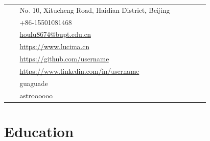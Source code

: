\documentclass[10pt]{article} %
\begin{document}
\begin{paracol}{2}
\parbox[top][0.12\textheight][c]{\linewidth}{ %
	\vspace{-0.04\textheight} %
	\colorbox{shade}{ %
		\begin{supertabular}{p{0.05\linewidth}|p{0.775\linewidth}} %
			\raisebox{-1pt}{\faHome} & No. 10, Xitucheng Road, Haidian District, Beijing \\ %
			\raisebox{-1pt}{\faPhone} & +86-15501081468 \\ %
			\raisebox{0pt}{\small\faEnvelope} & \href{mailto:houlu8674@bupt.edu.cn}{houlu8674@bupt.edu.cn} \\ %
			\raisebox{-1pt}{\small\faDesktop} & \href{https://www.lucima.cn}{https://www.lucima.cn} \\ %
			\raisebox{-1pt}{\faGithub} & \href{https://github.com/username}{https://github.com/username} \\ %
			\raisebox{-1pt}{\faLinkedinSquare} & \href{https://www.linkedin.com/in/username}{https://www.linkedin.com/in/username} \\ %
			\raisebox{-1pt}{\faWechat} &
			guaguade\\
			\raisebox{-1pt}{\faWeibo} &
			\href{http://weibo.com/lucima}{astroooooo}\\
		\end{supertabular}
	}
}


\section{Education} 





\end{paracol}
\end{document}
